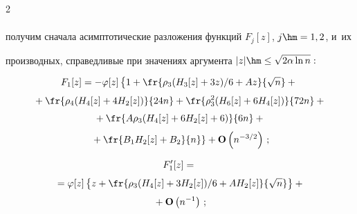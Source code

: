 \begin{multicols}{2}
\begin{align*}
 \end{align*}


 получим сначала асимптотические разложения функций $F_j[z]$, $j\hm=1,2$, и~их 


 производных, справедливые при значениях аргумента $|z|\hm\le \sqrt{2\alpha\ln n}:$


 \begin{multline}


F_1[z] =-\varphi[z] \left\{1+\fr{\rho_3 (H_3[z]+3z)/6+Az}{\sqrt{n}}


 +{}\right.\\[3pt]


{}+\fr{\rho_4 (H_4[z]+4H_2[z])}{24n}+


\fr{\rho_3^2 (H_6[z]+6H_4[z])}{72n}+{}\\[3pt]


{} +\fr{A \rho_3 (H_4[z]+6H_2[z]+6)}{6n}+{}\\[3pt]


\left. {} +\fr{B_1 H_2[z]+B_2}{n}


 \right\}+\mathbf{O}\left(n^{-3/2}\right)\,;


 \label{e31-ch}


 \end{multline}


 


 \vspace*{-12pt}


 


 \noindent


 \begin{multline}


F_1'[z] ={}\\[3pt]


{}=\varphi[z]


 \left\{z+\fr{\rho_3 (H_4[z]+3H_2[z])/6+AH_2[z]}{\sqrt{n}}\right\}+{}\\[3pt]


{} +\mathbf{O}\left(n^{-1}\right)\,;


 \label{e32-ch}


 \end{multline}










\noindent



\end{multicols}
